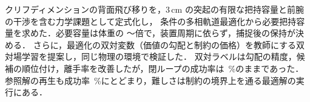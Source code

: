 クリフディメンションの背面飛び移りを，3\,cm の突起の有限な把持容量と前腕の干渉を含む力学課題として定式化し，
\gridN 条件の多相軌道最適化から必要把持容量を求めた．必要容量は体重の \capBWmin〜\capBWmax 倍で，装置周期に依らず，捕捉後の保持が決める．
さらに，最適化の双対変数（価値の勾配と制約の価格）を教師にする双対場学習を提案し，同じ物理の環境で検証した．
双対ラベルは勾配の精度，候補の順位付け，離手率を改善したが，閉ループの成功率は \clSmpcSuccInt\,\%のままであった．
参照解の再生も成功率 \clReplaySuccInt\,\%にとどまり，難しさは制約の境界上を通る最適解の実行にある．
